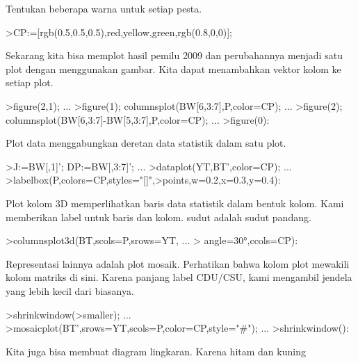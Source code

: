 \documentclass[a4paper,10pt]{article}
\begin{document}
\begin{eulernotebook}
\begin{eulercomment}
\begin{eulercomment}
\begin{eulercomment}
Tentukan beberapa warna untuk setiap pesta.
\end{eulercomment}
\begin{eulerprompt}
>CP:=[rgb(0.5,0.5,0.5),red,yellow,green,rgb(0.8,0,0)];
\end{eulerprompt}
\begin{eulercomment}
Sekarang kita bisa memplot hasil pemilu 2009 dan perubahannya menjadi
satu plot dengan menggunakan gambar. Kita dapat menambahkan vektor
kolom ke setiap plot.
\end{eulercomment}
\begin{eulerprompt}
>figure(2,1);  ...
>figure(1); columnsplot(BW[6,3:7],P,color=CP); ...
>figure(2); columnsplot(BW[6,3:7]-BW[5,3:7],P,color=CP);  ...
>figure(0):
\end{eulerprompt}
\begin{eulercomment}
Plot data menggabungkan deretan data statistik dalam satu plot.
\end{eulercomment}
\begin{eulerprompt}
>J:=BW[,1]'; DP:=BW[,3:7]'; ...
>dataplot(YT,BT',color=CP);  ...
>labelbox(P,colors=CP,styles="[]",>points,w=0.2,x=0.3,y=0.4):
\end{eulerprompt}
\begin{eulercomment}
Plot kolom 3D memperlihatkan baris data statistik dalam bentuk kolom.
Kami memberikan label untuk baris dan kolom. sudut adalah sudut
pandang.
\end{eulercomment}
\begin{eulerprompt}
>columnsplot3d(BT,scols=P,srows=YT, ...
>  angle=30°,ccols=CP):
\end{eulerprompt}
\begin{eulercomment}
Representasi lainnya adalah plot mosaik. Perhatikan bahwa kolom plot
mewakili kolom matriks di sini. Karena panjang label CDU/CSU, kami
mengambil jendela yang lebih kecil dari biasanya.
\end{eulercomment}
\begin{eulerprompt}
>shrinkwindow(>smaller);  ...
>mosaicplot(BT',srows=YT,scols=P,color=CP,style="#"); ...
>shrinkwindow():
\end{eulerprompt}
\begin{eulercomment}
Kita juga bisa membuat diagram lingkaran. Karena hitam dan kuning

\end{eulercomment}
\end{eulercomment}
\end{eulercomment}
\end{eulernotebook}
\end{document}
